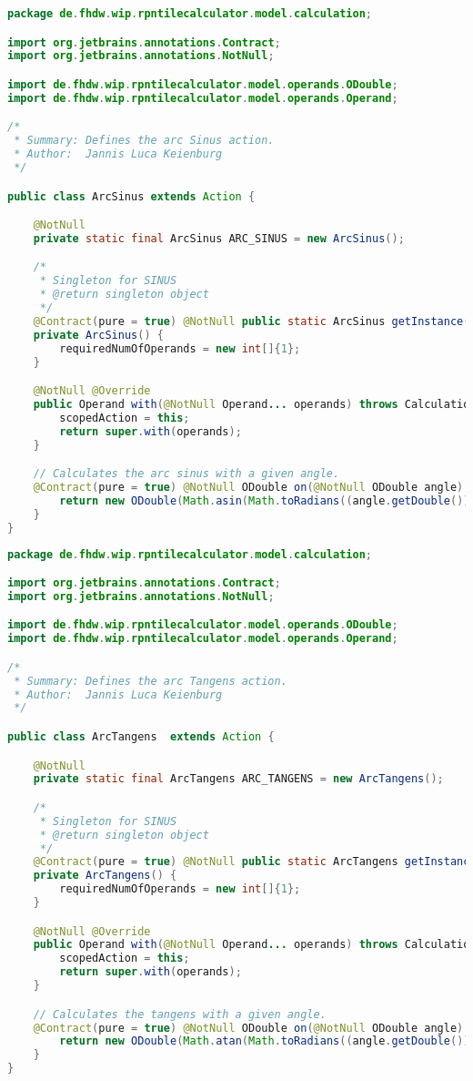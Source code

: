 \begin{lstlisting}[caption=ArcSinus (Keienburg),label=list:ArcSinus,language=Java]
package de.fhdw.wip.rpntilecalculator.model.calculation;

import org.jetbrains.annotations.Contract;
import org.jetbrains.annotations.NotNull;

import de.fhdw.wip.rpntilecalculator.model.operands.ODouble;
import de.fhdw.wip.rpntilecalculator.model.operands.Operand;

/*
 * Summary: Defines the arc Sinus action.
 * Author:  Jannis Luca Keienburg
 */

public class ArcSinus extends Action {

    @NotNull
    private static final ArcSinus ARC_SINUS = new ArcSinus();

    /*
     * Singleton for SINUS
     * @return singleton object
     */
    @Contract(pure = true) @NotNull public static ArcSinus getInstance() { return ARC_SINUS; }
    private ArcSinus() {
        requiredNumOfOperands = new int[]{1};
    }

    @NotNull @Override
    public Operand with(@NotNull Operand... operands) throws CalculationException {
        scopedAction = this;
        return super.with(operands);
    }

    // Calculates the arc sinus with a given angle.
    @Contract(pure = true) @NotNull ODouble on(@NotNull ODouble angle) {
        return new ODouble(Math.asin(Math.toRadians((angle.getDouble()))));
    }
}
\end{lstlisting}    

\begin{lstlisting}[caption=ArcTangens (Keienburg),label=list:ArcTangens,language=Java]
package de.fhdw.wip.rpntilecalculator.model.calculation;

import org.jetbrains.annotations.Contract;
import org.jetbrains.annotations.NotNull;

import de.fhdw.wip.rpntilecalculator.model.operands.ODouble;
import de.fhdw.wip.rpntilecalculator.model.operands.Operand;

/*
 * Summary: Defines the arc Tangens action.
 * Author:  Jannis Luca Keienburg
 */

public class ArcTangens  extends Action {

    @NotNull
    private static final ArcTangens ARC_TANGENS = new ArcTangens();

    /*
     * Singleton for SINUS
     * @return singleton object
     */
    @Contract(pure = true) @NotNull public static ArcTangens getInstance() { return ARC_TANGENS; }
    private ArcTangens() {
        requiredNumOfOperands = new int[]{1};
    }

    @NotNull @Override
    public Operand with(@NotNull Operand... operands) throws CalculationException {
        scopedAction = this;
        return super.with(operands);
    }

    // Calculates the tangens with a given angle.
    @Contract(pure = true) @NotNull ODouble on(@NotNull ODouble angle) {
        return new ODouble(Math.atan(Math.toRadians((angle.getDouble()))));
    }
}
\end{lstlisting}    

